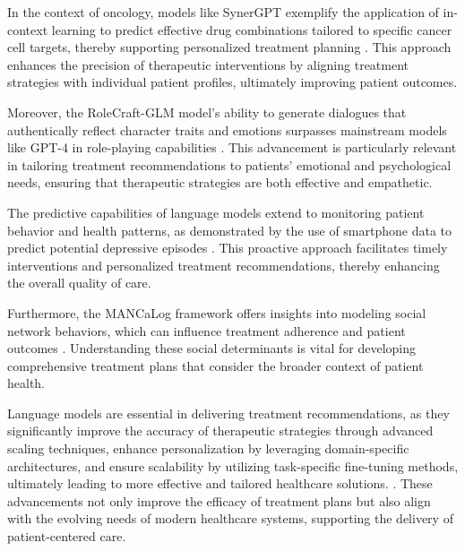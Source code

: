 In the context of oncology, models like SynerGPT exemplify the application of in-context learning to predict effective drug combinations tailored to specific cancer cell targets, thereby supporting personalized treatment planning \cite{edwards2023synergptincontextlearningpersonalized}. This approach enhances the precision of therapeutic interventions by aligning treatment strategies with individual patient profiles, ultimately improving patient outcomes.



Moreover, the RoleCraft-GLM model's ability to generate dialogues that authentically reflect character traits and emotions surpasses mainstream models like GPT-4 in role-playing capabilities \cite{tao2024rolecraftglmadvancingpersonalizedroleplaying}. This advancement is particularly relevant in tailoring treatment recommendations to patients' emotional and psychological needs, ensuring that therapeutic strategies are both effective and empathetic.



The predictive capabilities of language models extend to monitoring patient behavior and health patterns, as demonstrated by the use of smartphone data to predict potential depressive episodes \cite{jeong2016predictiveanalyticsusingsmartphone}. This proactive approach facilitates timely interventions and personalized treatment recommendations, thereby enhancing the overall quality of care.



Furthermore, the MANCaLog framework offers insights into modeling social network behaviors, which can influence treatment adherence and patient outcomes \cite{shakarian2022reasoningcomplexnetworkslogic}. Understanding these social determinants is vital for developing comprehensive treatment plans that consider the broader context of patient health.



Language models are essential in delivering treatment recommendations, as they significantly improve the accuracy of therapeutic strategies through advanced scaling techniques, enhance personalization by leveraging domain-specific architectures, and ensure scalability by utilizing task-specific fine-tuning methods, ultimately leading to more effective and tailored healthcare solutions. \cite{chowdhery2023palm}. These advancements not only improve the efficacy of treatment plans but also align with the evolving needs of modern healthcare systems, supporting the delivery of patient-centered care.



